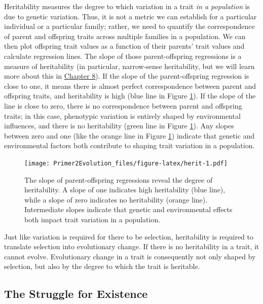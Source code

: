 \documentclass[
]{book}
\begin{document}
Heritability measures the degree to which variation in a trait \emph{in a population} is due to genetic variation. Thus, it is not a metric we can establish for a particular individual or a particular family; rather, we need to quantify the correspondence of parent and offspring traits across multiple families in a population. We can then plot offspring trait values as a function of their parents' trait values and calculate regression lines. The slope of those parent-offspring regressions is a measure of heritability (in particular, narrow-sense heritability, but we will learn more about this in \href{the-evolution-of-quantitative-traits.html}{Chapter 8}). If the slope of the parent-offspring regression is close to one, it means there is almost perfect correspondence between parent and offspring traits, and heritability is high (blue line in Figure \ref{fig:herit}). If the slope of the line is close to zero, there is no correspondence between parent and offspring traits; in this case, phenotypic variation is entirely shaped by environmental influences, and there is no heritability (green line in Figure \ref{fig:herit}). Any slopes between zero and one (like the orange line in Figure \ref{fig:herit}) indicate that genetic and environmental factors both contribute to shaping trait variation in a population.

\begin{figure}
\centering
\texttt{[image: Primer2Evolution\_files/figure-latex/herit-1.pdf]}
\caption{\label{fig:herit}The slope of parent-offspring regressions reveal the degree of heritability. A slope of one indicates high heritability (blue line), while a slope of zero indicates no heritability (orange line). Intermediate slopes indicate that genetic and environmental effects both impact trait variation in a population.}
\end{figure}

Just like variation is required for there to be selection, heritability is required to translate selection into evolutionary change. If there is no heritability in a trait, it cannot evolve. Evolutionary change in a trait is consequently not only shaped by selection, but also by the degree to which the trait is heritable.

\hypertarget{the-struggle-for-existence}{%
\subsection{The Struggle for Existence}\label{the-struggle-for-existence}}
\end{document}
